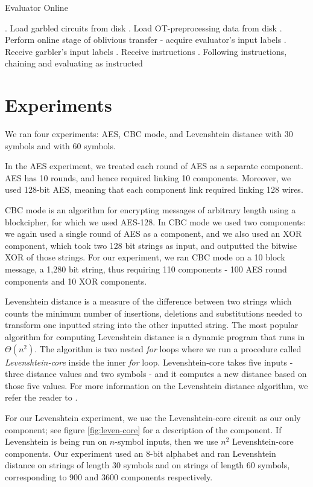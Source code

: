 \begin{algorithm}
    \caption{Evaluator Online}
    \label{alg:evaluator-online}
    \begin{algorithmic}
        . Load garbled circuits from disk
        . Load OT-preprocessing data from disk
        . Perform online stage of oblivious transfer - acquire evaluator's input labels
        . Receive garbler's input labels
        . Receive instructions
        . Following instructions, chaining and evaluating as instructed
    \end{algorithmic}
\end{algorithm}

\section{Experiments}
We ran four experiments: AES, CBC mode, and Levenshtein distance with 30 symbols and with 60 symbols. 

In the AES experiment, we treated each round of AES as a separate component. AES has 10 rounds, and hence required linking 10 components. Moreover, we used 128-bit AES, meaning that each component link required linking 128 wires. 

CBC mode is an algorithm for encrypting messages of arbitrary length using a blockcipher, for which we used AES-128. 
In CBC mode we used two components: we again used a single round of AES as a component, and we also used an XOR component, which took two 128 bit strings as input, and outputted the bitwise XOR of those strings.
For our experiment, we ran CBC mode on a 10 block message, a 1,280 bit string, thus requiring 110 components - 100 AES round components and 10 XOR components. 

Levenshtein distance is a measure of the difference between two strings which counts the minimum number of insertions, deletions and substitutions needed to transform one inputted string into the other inputted string. 
The most popular algorithm for computing Levenshtein distance is a dynamic program that runs in $\Theta(n^2)$. 
The algorithm is  two nested \textit{for} loops where we run a procedure called \textit{Levenshtein-core} inside the inner \textit{for} loop. 
Levenshtein-core takes five inputs - three distance values and two symbols - and it computes a new distance based on those five values.
For more information on the Levenshtein distance algorithm, we refer the reader to \cite{wiki-leven}. 

For our Levenshtein experiment, we use the Levenshtein-core circuit as our only component; see figure \ref{fig:leven-core} for a description of the component.
If Levenshtein is being run on $n$-symbol inputs, then we use $n^2$ Levenshtein-core components. 
Our experiment used an 8-bit alphabet and ran Levenshtein distance on strings of length 30 symbols and on strings of length 60 symbols, corresponding to 900 and 3600 components respectively. 

